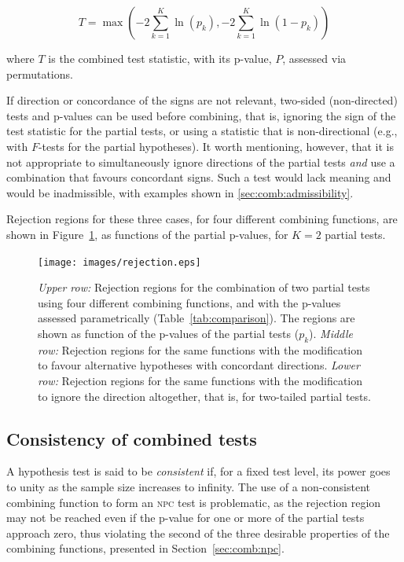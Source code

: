 \begin{equation}
T = \max\left(-2\sum_{k=1}^{K} \ln\left(p_{k}\right),-2\sum_{k=1}^{K} \ln\left(1-p_{k}\right)\right)
\label{eqn:pearson-david}
\end{equation}

\noindent
where $T$ is the combined test statistic, with its p-value, $P$, assessed via permutations.

If direction or concordance of the signs are not relevant, two-sided (non-directed) tests and p-values can be used before combining, that is, ignoring the sign of the test statistic for the partial tests, or using a statistic that is non-directional (e.g., with $F$-tests for the partial hypotheses). It worth mentioning, however, that it is not appropriate to simultaneously ignore directions of the partial tests \emph{and} use a combination that favours concordant signs. Such a test would lack meaning and would be inadmissible, with examples shown in \ref{sec:comb:admissibility}. 

Rejection regions for these three cases, for four different combining functions, are shown in Figure~\ref{fig:rejection}, as functions of the partial p-values, for $K=2$ partial tests.

\begin{figure}[p]
\begin{center}
\centerline{\texttt{[image: images/rejection.eps]}}
\end{center}
\caption[Rejection regions of two partial tests with four different combining functions.]{
\emph{Upper row:} Rejection regions for the combination of two partial tests using four different combining functions, and with the p-values assessed parametrically (Table~\ref{tab:comparison}). The regions are shown as function of the p-values of the partial tests ($p_k$).
\emph{Middle row:} Rejection regions for the same functions with the modification to favour alternative hypotheses with concordant directions.
\emph{Lower row:} Rejection regions for the same functions with the modification to ignore the direction altogether, that is, for two-tailed partial tests.}
\label{fig:rejection}
\end{figure}

\subsection{Consistency of combined tests}
\label{sec:comb:consistency}

A hypothesis test is said to be \emph{consistent} if, for a fixed test level, its power goes to unity as the sample size increases to infinity. The use of a non-consistent combining function to form an \textsc{npc} test is problematic, as the rejection region may not be reached even if the p-value for one or more of the partial tests approach zero, thus violating the second of the three desirable properties of the combining functions, presented in Section~\ref{sec:comb:npc}.

